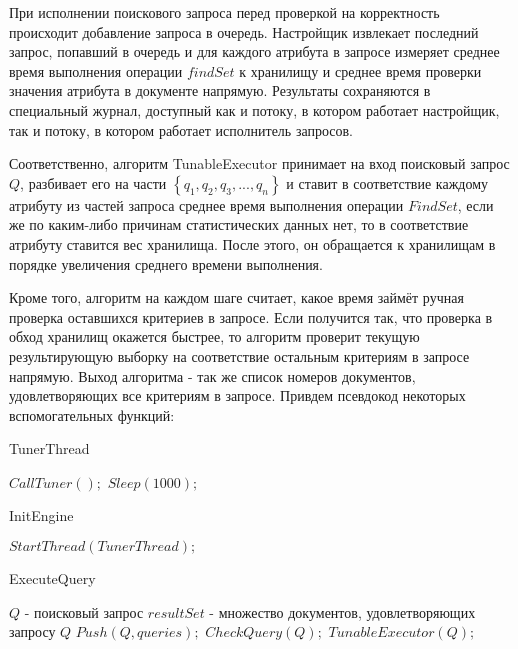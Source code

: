 \documentclass{matmex-diploma}
\begin{document}
        При исполнении поискового запроса перед проверкой на корректность происходит добавление запроса в очередь. Настройщик извлекает последний запрос, попавший в очередь и для каждого атрибута в запросе измеряет среднее время выполнения операции $findSet$  к хранилищу и среднее время проверки значения атрибута в документе напрямую. Результаты сохраняются в специальный журнал, доступный как и потоку, в котором работает настройщик, так и потоку, в котором работает исполнитель запросов.
        
        Соответственно, алгоритм TunableExecutor принимает на вход поисковый запрос $Q$, разбивает его на части $\left\{ q_1, q_2, q_3, ... , q_n \right\} $ и ставит в соответствие каждому атрибуту из частей запроса среднее время выполнения операции $FindSet$, если же по каким-либо причинам статистических данных нет, то в соответствие атрибуту ставится вес хранилища. После этого, он обращается к хранилищам в порядке увеличения среднего времени выполнения. 
        
        Кроме того, алгоритм на каждом шаге считает, какое время займёт ручная проверка оставшихся критериев в запросе. Если получится так, что проверка в обход хранилищ окажется быстрее, то алгоритм проверит текущую результирующую выборку на соответствие остальным критериям в запросе напрямую. Выход алгоритма - так же список номеров документов, удовлетворяющих все критериям в запросе. Привдем псевдокод некоторых вспомогательных функций:
        \begin{algorithm}[H]
        \caption{TunerThread}
        \label{tunerThread}
            \begin{algorithmic}
                    \STATE $CallTuner();$
                    \STATE $Sleep(1000);$
                \ENDWHILE
            \end{algorithmic}
        \end{algorithm}
        
        \begin{algorithm}[H]
        \caption{InitEngine}
        \label{init}
            \begin{algorithmic}
                \STATE $StartThread(TunerThread);$
            \end{algorithmic}
        \end{algorithm}
        
        \begin{algorithm}[H]
        \caption{ExecuteQuery}
        \label{exec}
            \begin{algorithmic}
                \REQUIRE $Q$ - поисковый запрос
                \ENSURE $resultSet$ - множество документов, удовлетворяющих запросу $Q$
                \STATE $Push(Q, queries);$
                \STATE $CheckQuery(Q);$  
                \RETURN $TunableExecutor(Q);$
            \end{algorithmic}
        \end{algorithm}
        
\end{document}
